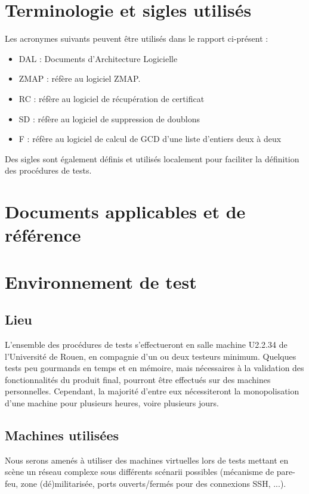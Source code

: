 \documentclass[a4paper,11pt,french]{article}
\begin{document}
\section{Terminologie et sigles utilisés}
Les acronymes suivants peuvent être utilisés dans le rapport ci-présent :
\begin{itemize}
\item DAL :  Documents d'Architecture Logicielle
\item ZMAP : réfère au logiciel ZMAP.
\item RC : réfère au logiciel de récupération de certificat
\item SD : réfère au logiciel de suppression de doublons
\item F : réfère au logiciel de calcul de GCD d'une liste d'entiers deux à deux
\end{itemize}
Des sigles sont également définis et utilisés localement pour faciliter la définition des procédures de tests.

\section{Documents applicables et de référence}

\section{Environnement de test}

\subsection{Lieu}

L'ensemble des procédures de tests s'effectueront en salle machine U2.2.34 de l'Université de Rouen, en compagnie d'un ou deux testeurs minimum. Quelques tests peu gourmands en temps et en mémoire, mais nécessaires à la validation des fonctionnalités du produit final, pourront être effectués sur des machines personnelles.
Cependant, la majorité d'entre eux nécessiteront la monopolisation d'une machine pour plusieurs heures, voire plusieurs jours.

\subsection{Machines utilisées}

Nous serons amenés à utiliser des machines virtuelles lors de tests mettant en scène un réseau complexe sous différents scénarii possibles (mécanisme de pare-feu, zone (dé)militarisée, ports ouverts/fermés pour des connexions SSH, ...). \\
\end{document}
